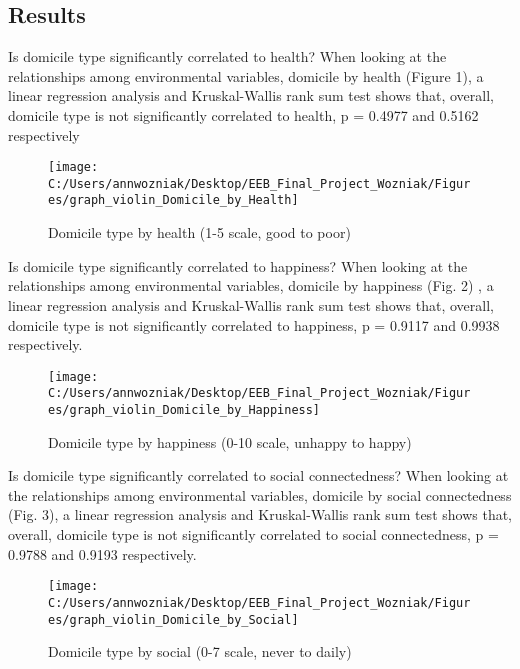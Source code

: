\hypertarget{results}{%
\subsection{Results}\label{results}}

Is domicile type significantly correlated to health? When looking at the
relationships among environmental variables, domicile by health (Figure
1), a linear regression analysis and Kruskal-Wallis rank sum test shows
that, overall, domicile type is not significantly correlated to health,
p = 0.4977 and 0.5162 respectively

\begin{Schunk}
\begin{figure}
\texttt{[image: C:/Users/annwozniak/Desktop/EEB\_Final\_Project\_Wozniak/Figures/graph\_violin\_Domicile\_by\_Health]} \caption[Domicile type by health (1-5 scale, good to poor)]{Domicile type by health (1-5 scale, good to poor)}\label{fig:fig.1}
\end{figure}
\end{Schunk}

Is domicile type significantly correlated to happiness? When looking at
the relationships among environmental variables, domicile by happiness
(Fig. 2) , a linear regression analysis and Kruskal-Wallis rank sum test
shows that, overall, domicile type is not significantly correlated to
happiness, p = 0.9117 and 0.9938 respectively.

\begin{Schunk}
\begin{figure}
\texttt{[image: C:/Users/annwozniak/Desktop/EEB\_Final\_Project\_Wozniak/Figures/graph\_violin\_Domicile\_by\_Happiness]} \caption[Domicile type by happiness (0-10 scale, unhappy to happy)]{Domicile type by happiness (0-10 scale, unhappy to happy)}\label{fig:fig.2}
\end{figure}
\end{Schunk}

Is domicile type significantly correlated to social connectedness? When
looking at the relationships among environmental variables, domicile by
social connectedness (Fig. 3), a linear regression analysis and
Kruskal-Wallis rank sum test shows that, overall, domicile type is not
significantly correlated to social connectedness, p = 0.9788 and 0.9193
respectively.

\begin{Schunk}
\begin{figure}
\texttt{[image: C:/Users/annwozniak/Desktop/EEB\_Final\_Project\_Wozniak/Figures/graph\_violin\_Domicile\_by\_Social]} \caption[Domicile type by social (0-7 scale, never to daily)]{Domicile type by social (0-7 scale, never to daily)}\label{fig:fig.3}
\end{figure}
\end{Schunk}

